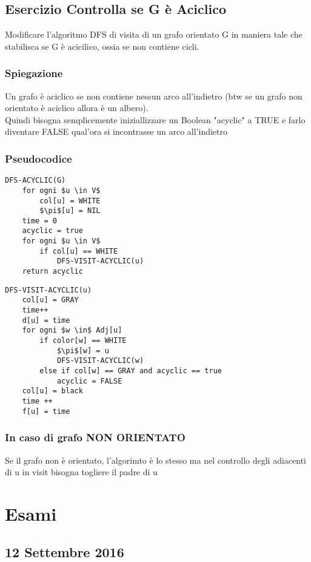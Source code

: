 \documentclass[12pt, a4paper, openany]{book}
\begin{document}
	\section{Esercizio Controlla se G è Aciclico}
	Modificare l’algoritmo DFS di visita di un grafo orientato G in maniera tale che stabilisca
	se G è acicilico, ossia se non contiene cicli.
	\subsection*{Spiegazione}
	Un grafo è aciclico se non contiene nessun arco all'indietro (btw se un grafo non orientato è aciclico allora è un albero).
	\\Quindi bisogna semplicemente iniziallizzare un Boolean "acyclic" a TRUE e farlo diventare FALSE qual'ora si incontrasse un arco all'indietro

	\subsection*{Pseudocodice}
	\begin{lstlisting}[mathescape=true]
DFS-ACYCLIC(G)
    for ogni $u \in V$
        col[u] = WHITE
        $\pi$[u] = NIL
    time = 0
    acyclic = true
    for ogni $u \in V$
        if col[u] == WHITE
            DFS-VISIT-ACYCLIC(u)
    return acyclic    
\end{lstlisting}

	\begin{lstlisting}[mathescape=true]
DFS-VISIT-ACYCLIC(u)
    col[u] = GRAY
    time++
    d[u] = time
    for ogni $w \in$ Adj[u]
        if color[w] == WHITE
            $\pi$[w] = u
            DFS-VISIT-ACYCLIC(w)
        else if col[w] == GRAY and acyclic == true
            acyclic = FALSE
    col[u] = black
    time ++
    f[u] = time
\end{lstlisting}

	\subsection*{In caso di grafo NON ORIENTATO}
	Se il grafo non è orientato, l'algorimto è lo stesso ma nel controllo degli adiacenti di u in visit bisogna togliere il padre di u

\chapter{Esami}
\section{12 Settembre 2016}
\end{document}
